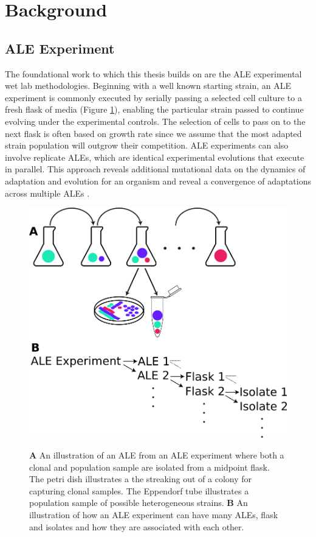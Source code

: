 \documentclass[12pt,final,masters,chapterheads]{ucsd}  %
\begin{document}
\section{Background}
\subsection{ALE Experiment}
%
%

%
%
The foundational work to which this thesis builds on are the ALE experimental wet lab methodologies. Beginning with a well known starting strain, an ALE experiment is commonly executed by serially passing a selected cell culture to a fresh flask of media (Figure \ref{fig:ale_experiment_samples}), enabling the particular strain passed to continue evolving under the experimental controls. The selection of cells to pass on to the next flask is often based on growth rate since we assume that the most adapted strain population will outgrow their competition. ALE experiments can also involve replicate ALEs, which are identical experimental evolutions that execute in parallel. This approach reveals additional mutational data on the dynamics of adaptation and evolution for an organism and reveal a convergence of adaptations across multiple ALEs \cite{sys_bio_book}.
\begin{figure}[h!]
  \caption{\textbf{A} An illustration of an ALE from an ALE experiment where both a clonal and population sample are isolated from a midpoint flask. The petri dish illustrates a the streaking out of a colony for capturing clonal samples. The Eppendorf tube illustrates a population sample of possible heterogeneous strains. \textbf{B} An illustration of how an ALE experiment can have many ALEs, flask and isolates and how they are associated with each other.}
  \centering
  \includegraphics[width=1\textwidth]{ale_experiment_samples.png}
  \label{fig:ale_experiment_samples}
\end{figure}
\end{document}
